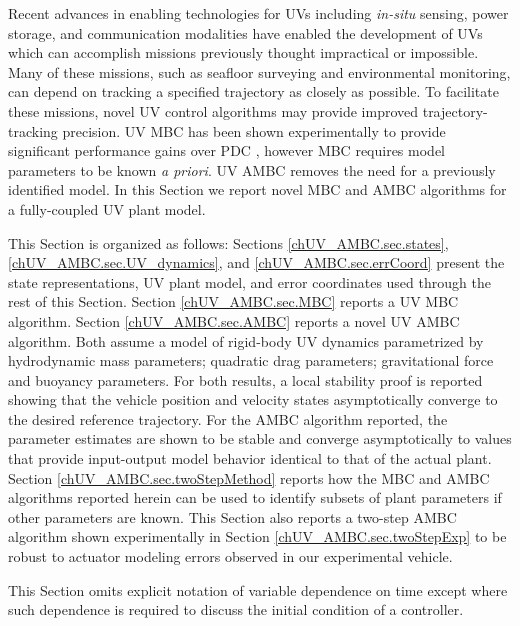 
Recent advances in enabling technologies for \acp{UV} including {\it in-situ}
sensing, power storage, and communication modalities have enabled the
development of \acp{UV} which can accomplish missions previously thought
impractical or impossible.
%
Many of these missions, such as seafloor surveying and
environmental monitoring, can depend on tracking a specified trajectory as
closely as possible.
%
%
To facilitate these missions, novel \ac{UV} control algorithms may
provide improved trajectory-tracking precision.
%
\ac{UV} \ac{MBC} has been shown experimentally to provide significant
performance gains over \ac{PDC} \cite{martinControl_ICRA13}, however \ac{MBC}
requires model parameters to be known {\it a priori}.
%
\ac{UV} \acf{AMBC} removes the need for a previously identified model.
%
In this Section we report novel \ac{MBC} and \ac{AMBC} algorithms for a
fully-coupled \ac{UV} plant model.


This Section is organized as follows: Sections
\ref{chUV_AMBC.sec.states}, \ref{chUV_AMBC.sec.UV_dynamics},
and \ref{chUV_AMBC.sec.errCoord} present the state
representations, \ac{UV} plant model, and error coordinates used
through the rest of this Section.
%
Section \ref{chUV_AMBC.sec.MBC} reports a \ac{UV} \ac{MBC} algorithm.
%
Section \ref{chUV_AMBC.sec.AMBC} reports a novel \ac{UV} \ac{AMBC}
algorithm.
%
Both assume a model of rigid-body \ac{UV} dynamics parametrized by
hydrodynamic mass parameters; quadratic drag parameters; gravitational
force and buoyancy parameters.
%
For both results, a local stability proof is reported showing that the
vehicle position and velocity states asymptotically converge to the
desired reference trajectory.
%
For the \ac{AMBC} algorithm reported, the parameter estimates are shown
to be stable and converge asymptotically to values that provide
input-output model behavior identical to that of the actual plant.
%
Section \ref{chUV_AMBC.sec.twoStepMethod} reports how the \ac{MBC} and
\ac{AMBC} algorithms reported herein can be used to identify subsets
of plant parameters if other parameters are known.  
%
This Section also reports a two-step \ac{AMBC} algorithm shown
experimentally in Section \ref{chUV_AMBC.sec.twoStepExp} to be robust
to actuator modeling errors observed in our experimental vehicle.


This Section omits explicit notation of variable dependence on time
except where such dependence is required to discuss the initial
condition of a controller.
